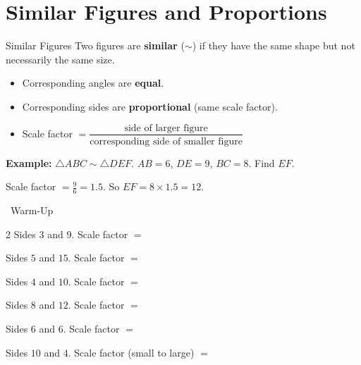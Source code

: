 \section{Similar Figures and Proportions}

\begin{quickReview}{Similar Figures}
Two figures are \textbf{similar} ($\sim$) if they have the same shape but not necessarily the same size.

\begin{itemize}[leftmargin=*]
    \item Corresponding angles are \textbf{equal}.
    \item Corresponding sides are \textbf{proportional} (same scale factor).
    \item Scale factor $= \dfrac{\text{side of larger figure}}{\text{corresponding side of smaller figure}}$
\end{itemize}

\medskip
\textbf{Example:} $\triangle ABC \sim \triangle DEF$. $AB = 6$, $DE = 9$, $BC = 8$. Find $EF$.

Scale factor $= \frac{9}{6} = 1.5$. So $EF = 8 \times 1.5 = 12$.
\end{quickReview}

\begin{practiceBox}[funGreen]{\faSun~Warm-Up}


\begin{multicols}{2}
\prob Sides $3$ and $9$. Scale factor $=$ \answerBlank[2cm]

\prob Sides $5$ and $15$. Scale factor $=$ \answerBlank[2cm]

\prob Sides $4$ and $10$. Scale factor $=$ \answerBlank[2cm]

\prob Sides $8$ and $12$. Scale factor $=$ \answerBlank[2cm]

\prob Sides $6$ and $6$. Scale factor $=$ \answerBlank[2cm]

\prob Sides $10$ and $4$. Scale factor (small to large) $=$ \answerBlank[2cm]
\end{multicols}
\end{practiceBox}

